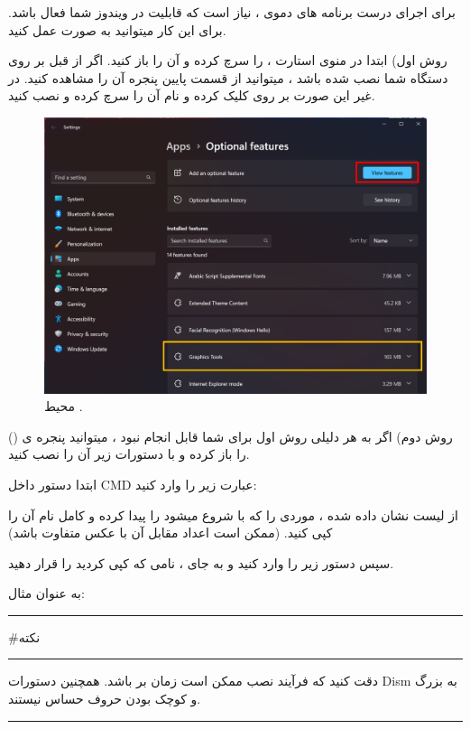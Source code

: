 {  \large
برای اجرای درست برنامه های دموی  ، نیاز است که قابلیت  در ویندوز شما فعال باشد.
برای این کار میتوانید به صورت عمل کنید.

روش اول)
ابتدا در منوی استارت ،  را سرچ کرده و آن را باز کنید.
اگر  از قبل بر روی دستگاه شما نصب شده باشد ، میتوانید از قسمت پایین پنجره آن را مشاهده کنید.
در غیر این صورت بر روی  کلیک کرده و نام آن را سرچ کرده و نصب کنید.

}
    \begin{figure}[H]
        \centering
        \includegraphics[width=\textwidth]{Images/1.Intro.4.1.png}
        \caption{محیط .}
    \end{figure}


{  \large
روش دوم)
اگر به هر دلیلی روش اول برای شما قابل انجام نبود ، میتوانید پنجره ی  () را باز کرده و با دستورات زیر آن را نصب کنید.

ابتدا دستور داخل CMD عبارت زیر را وارد کنید:


از لیست نشان داده شده ، موردی را که با  شروع میشود را پیدا کرده و کامل نام آن را کپی کنید. (ممکن است اعداد مقابل آن با عکس متفاوت باشد)

سپس دستور زیر را وارد کنید و به جای  ، نامی که کپی کردید را قرار دهید.


به عنوان مثال:


\rule{\textwidth}{0.5pt}
{\LARGE \#نکته\\}
\rule{\textwidth}{0.5pt}
{\large
دقت کنید که فرآیند نصب ممکن است زمان بر باشد. همچنین دستورات Dism به بزرگ و کوچک بودن حروف حساس نیستند.
}
\rule{\textwidth}{0.5pt}
}




\newpage